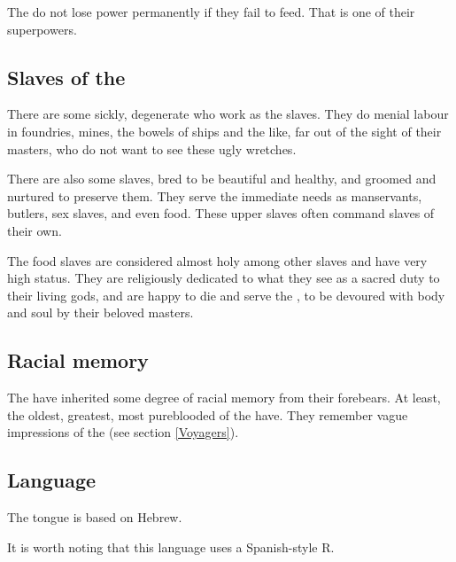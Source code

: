 The \Malachim{} do not lose power permanently if they fail to feed. That is one of their superpowers. 







\subsection{Slaves of the \resphain}
There are some sickly, degenerate \humans{} who work as the \resphainz{} slaves. They do menial labour in foundries, mines, the bowels of ships and the like, far out of the sight of their masters, who do not want to see these ugly wretches. 

There are also some  slaves, bred to be beautiful and healthy, and groomed and nurtured to preserve them. They serve the \resphainz{} immediate needs as manservants, butlers, sex slaves, and even food. These upper slaves often command slaves of their own. 

\label{Resphan food slaves}
The food slaves are considered almost holy among other slaves and have very high status. They are religiously dedicated to what they see as a sacred duty to their living gods, and are happy to die and serve the \resphain{}, to be devoured with body and soul by their beloved masters. 







\subsection{Racial memory}
The \resphain{} have inherited some degree of racial memory from their \bane{} forebears. At least, the oldest, greatest, most pureblooded of the \resphain{} have. They remember vague impressions of the \voyagers{} (see section \ref{Voyagers}). 







\subsection{Language}
The \Resphan{} tongue is based on Hebrew. 

It is worth noting that this language uses a Spanish-style  R. 







